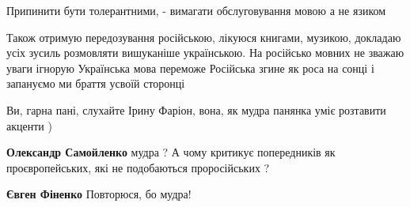 \begin{itemize}
 
Припинити бути толерантними, - вимагати обслуговування мовою а не язиком

 

Також отримую передозування російською, лікуюся книгами, музикою, докладаю усіх
зусиль розмовляти вишуканіше українською. На російсько мовних не зважаю уваги
ігнорую \Smiley[1.0][yellow] Українська мова переможе \Smiley[1.0][yellow] Російська згине як роса на сонці і
запануємо ми браття усвоїй сторонці \Smiley[1.0][yellow]

 
Ви, гарна пані, слухайте Ірину Фаріон, вона, як мудра панянка уміє розтавити
акценти )

\begin{itemize}
 
\textbf{Олександр Самойленко} мудра ? А чому критикує попередників як проєвропейських, які не подобаються проросійських ?

 
\textbf{Євген Фіненко}
Повторюся, бо мудра!
\end{itemize}

 


\end{itemize}
